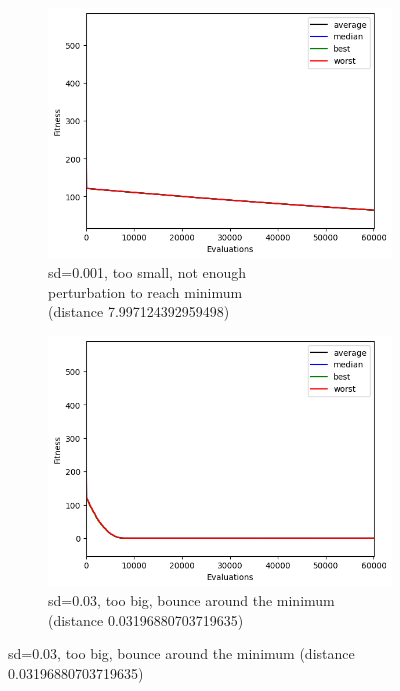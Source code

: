 \begin{figure}[H]
    \centering
    \begin{subfigure}[t]{0.5\textwidth}
        \centering
        \includegraphics[width=\linewidth]{images/lab1/fitness_10D_small_sd.png}
        \captionsetup{format=hang}
        \caption{sd=0.001, too small, not enough \\perturbation to reach minimum \\(distance 7.997124392959498)}
    \end{subfigure}%
    \begin{subfigure}[t]{0.5\textwidth}
        \centering
        \includegraphics[width=\linewidth]{images/lab1/fitness_10D_big_sd.png}
        \captionsetup{format=hang}
        \caption{sd=0.03, too big, bounce around the minimum (distance 0.03196880703719635)}
    \end{subfigure}
\end{figure}

